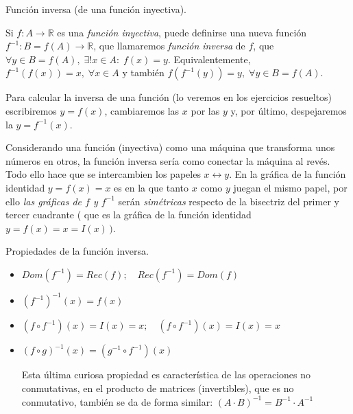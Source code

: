 		\begin{defi} {Función inversa} (de una función inyectiva).
		
		
			Si $f:A \to \mathbb R$ es una \emph{función inyectiva}, puede definirse una nueva función $f^{-1}:B=f(A) \to 	\mathbb R$, que llamaremos \emph{función inversa} de $f$, que $\forall y\in B=f(A), \; \exists ! x\in A: \; f(x)=y$. Equivalentemente, $f^{-1} \left(  f(x) \right)=x, \; \forall x \in A$ y también $f \left( f^{-1}(y)  \right) = y,\; \forall y \in B=f(A)$.

		\end{defi}
		
		Para calcular la inversa de una función (lo veremos en los ejercicios resueltos) escribiremos $y=f(x)$, cambiaremos las $x$ por las $y$ y, por último, despejaremos la $y=f^{-1}(x).$
		
		 Considerando una función (inyectiva) como una máquina que transforma unos números en otros, la función inversa serí­a como conectar la máquina al revés. Todo ello hace que se intercambien los papeles $x\leftrightarrow y$. En la gráfica de la función identidad $y=f(x)=x$ es en la que tanto $x$ como $y$ juegan el mismo papel, por ello \emph{las gráficas de $f$ y $f^{-1}$} serán \emph{simétricas} respecto de la bisectriz del primer y tercer cuadrante ( que es la gráfica de la función identidad $y=f(x)=x=I(x)\,)$.
		
		
		
		\begin{prop}{Propiedades de la función inversa.}
		\label{prop:funcion-inversa}
		\begin{itemize}
			
			\item $Dom(f^{-1})=Rec(f); \quad Rec(f^{-1})=Dom(f)$
			\item $ \left( f^{-1} \right) ^{-1} (x)=f(x) $
			\item $ (f \circ f^{-1}) (x)= I(x)=x; \quad (f \circ f^{-1})(x)=I(x)=x$
			\item $ \left( f \circ g   \right)^{-1}(x)=\left(  g^{-1}\circ f^{-1} \right)(x) $	
			
			\footnotesize{Esta última curiosa propiedad es caracterí­stica de las operaciones no conmutativas, en el producto de matrices (invertibles), que es no conmutativo, también se da de forma similar: $(A\cdot B)^{-1}=B^{-1}\cdot  A^{-1}$}
		\end{itemize}	
		
		\end{prop}
		
